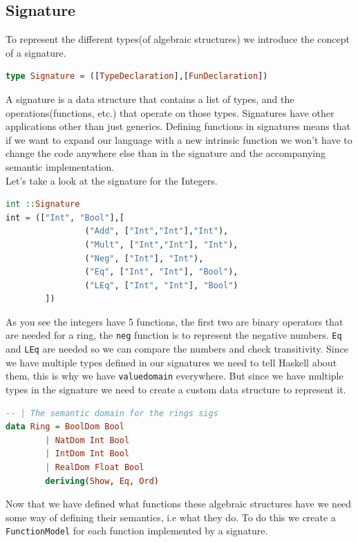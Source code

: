 \documentclass[tikz, border=5mm]{article}
\begin{document}
        \subsection{Signature}
        To represent the different types(of algebraic structures) we introduce the concept of a signature. 
        \begin{lstlisting}[language=Haskell]
type Signature = ([TypeDeclaration],[FunDeclaration])
        \end{lstlisting}
        A signature is a data structure that contains a list of types, and the operations(functions, etc.) that operate on those types.
        Signatures have other applications other than just generics. Defining functions in signatures means that if we want to expand our language with a new intrinsic function we won't
        have to change the code anywhere else than in the signature and the accompanying semantic implementation.\\
        Let's take a look at the signature for the Integers.
        \begin{lstlisting}[language=Haskell]
int ::Signature
int = (["Int", "Bool"],[
                ("Add", ["Int","Int"],"Int"),
                ("Mult", ["Int","Int"], "Int"),
                ("Neg", ["Int"], "Int"),
                ("Eq", ["Int", "Int"], "Bool"),
                ("LEq", ["Int", "Int"], "Bool")
        ])
        \end{lstlisting}
        As you see the integers have 5 functions, the first two are binary operators that are needed for a ring, the \verb+neg+ function is to represent the negative numbers.
        \verb+Eq+ and \verb+LEq+ are needed so we can compare the numbers and check transitivity.
        Since we have multiple types defined in our signatures we need to tell Haskell about them, this is why we have \verb+valuedomain+ everywhere.
        But since we have multiple types in the signature we need to create a custom data structure to represent it. \\
        \begin{lstlisting}[language=Haskell]
-- | The semantic domain for the rings sigs
data Ring = BoolDom Bool
        | NatDom Int Bool
        | IntDom Int Bool
        | RealDom Float Bool
        deriving(Show, Eq, Ord)
        \end{lstlisting}
        Now that we have defined what functions these algebraic structures have we need some way of defining their semantics, i.e what they do.
        To do this we create a \verb+FunctionModel+ for each function implemented by a signature.
\end{document}
